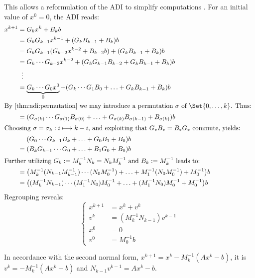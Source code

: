This allows a reformulation of the \ac{ADI} to simplify computations \cite{Li2002}.
For an initial value of $x^0 = 0$,
the ADI reads:
\begin{align*}
  x^{k+1}
  &= G_k x^k + B_k b \\
  &= G_k G_{k-1} x^{k-1} + (G_k B_{k-1} + B_k) b \\
  &= G_k G_{k-1} (G_{k-2} x^{k-2} + B_{k-2}b) + (G_k B_{k-1} + B_k) b \\
  &= G_k \cdots G_{k-2} x^{k-2} + (G_k G_{k-1} B_{k-2} + G_k B_{k-1} + B_k) b \\
  &\vdotswithin{=} \\
  &= \underbrace{G_k \cdots G_0 x^0}_0 + (G_k \cdots G_1 B_0 + \ldots + G_k B_{k-1} + B_k) b \\
\intertext{%
  By \autoref{thm:adi:permutation} we may introduce a permutation $\sigma$ of $\Set{0,\ldots,k}$.
  Thus:
}
  &= (G_{\sigma(k)} \cdots G_{\sigma(1)} B_{\sigma(0)} + \ldots + G_{\sigma(k)} B_{\sigma(k-1)} + B_{\sigma(k)}) b \\
\intertext{%
  Choosing $\sigma = \sigma_k : i \mapsto k-i$,
  and exploiting that $G_* B_* = B_* G_*$ commute,
  yields:
}
  &= (G_0 \cdots G_{k-1} B_k + \ldots + G_0 B_1 + B_0) b \\
  &= (B_k G_{k-1} \cdots G_0 + \ldots + B_1 G_0 + B_0) b \\
\intertext{%
  Further utilizing $G_k := M_k^{-1} N_k = N_k M_k^{-1}$ and $B_k := M_k^{-1}$ leads to:
}
  &= \big( M_k^{-1} (N_{k-1} M_{k-1}^{-1}) \cdots (N_0 M_0^{-1}) + \ldots + M_1^{-1} (N_0 M_0^{-1}) + M_0^{-1} \big) b \\
  &= \big( (M_k^{-1} N_{k-1}) \cdots (M_1^{-1} N_0) M_0^{-1} + \ldots + (M_1^{-1} N_0) M_0^{-1} + M_0^{-1} \big) b
\end{align*}
Regrouping reveals:
\begin{equation}
\label{eq:adi:recursion}
\left\{
\begin{aligned}
  x^{k+1} &= x^k + v^k \\
  v^k &= (M_k^{-1} N_{k-1}) v^{k-1} \\
  x^0 &= 0 \\
  v^0 &= M_0^{-1} b
\end{aligned}
\right.
\end{equation}

\begin{remark}
  In accordance with the second normal form,
  $x^{k+1} = x^k - M_k^{-1} (Ax^k - b)$, it is
  $v^k = - M_k^{-1} (Ax^k - b)$ and
  $N_{k-1} v^{k-1} = Ax^k - b$.
\end{remark}

